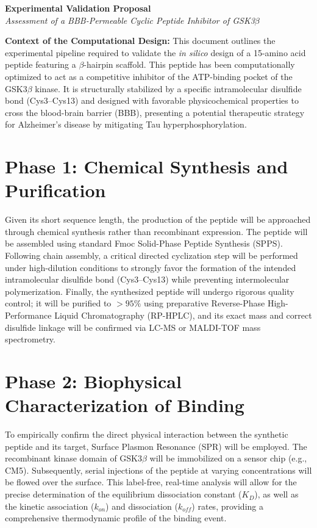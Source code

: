 \documentclass[11pt,a4paper]{article}
\begin{document}
\begin{center}
    \LARGE\textbf{Experimental Validation Proposal} \\
    \vspace{0.2cm}
    \large\textit{Assessment of a BBB-Permeable Cyclic Peptide Inhibitor of GSK3$\beta$}
\end{center}

\vspace{0.4cm}

\textbf{Context of the Computational Design:} This document outlines the experimental pipeline required to validate the \textit{in silico} design of a 15-amino acid peptide featuring a $\beta$-hairpin scaffold. This peptide has been computationally optimized to act as a competitive inhibitor of the ATP-binding pocket of the GSK3$\beta$ kinase. It is structurally stabilized by a specific intramolecular disulfide bond (Cys3--Cys13) and designed with favorable physicochemical properties to cross the blood-brain barrier (BBB), presenting a potential therapeutic strategy for Alzheimer's disease by mitigating Tau hyperphosphorylation.

\section*{Phase 1: Chemical Synthesis and Purification}
Given its short sequence length, the production of the peptide will be approached through chemical synthesis rather than recombinant expression. The peptide will be assembled using standard Fmoc Solid-Phase Peptide Synthesis (SPPS). Following chain assembly, a critical directed cyclization step will be performed under high-dilution conditions to strongly favor the formation of the intended intramolecular disulfide bond (Cys3--Cys13) while preventing intermolecular polymerization. Finally, the synthesized peptide will undergo rigorous quality control; it will be purified to $>95\%$ using preparative Reverse-Phase High-Performance Liquid Chromatography (RP-HPLC), and its exact mass and correct disulfide linkage will be confirmed via LC-MS or MALDI-TOF mass spectrometry.

\section*{Phase 2: Biophysical Characterization of Binding}
To empirically confirm the direct physical interaction between the synthetic peptide and its target, Surface Plasmon Resonance (SPR) will be employed. The recombinant kinase domain of GSK3$\beta$ will be immobilized on a sensor chip (e.g., CM5). Subsequently, serial injections of the peptide at varying concentrations will be flowed over the surface. This label-free, real-time analysis will allow for the precise determination of the equilibrium dissociation constant ($K_D$), as well as the kinetic association ($k_{on}$) and dissociation ($k_{off}$) rates, providing a comprehensive thermodynamic profile of the binding event.
\end{document}
